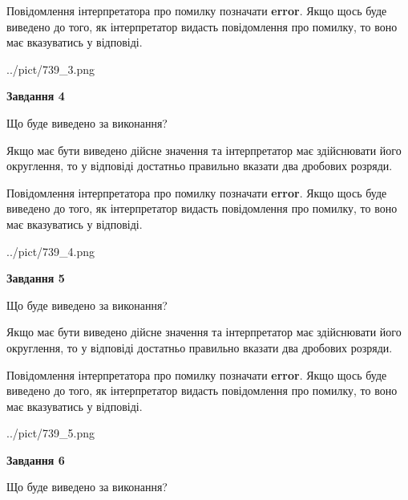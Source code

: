 \documentclass[12pt, ukrainian]{article}
\begin{document}
{\begin {Large}
Повідомлення інтерпретатора про помилку позначати \textbf{error}.
Якщо щось буде виведено до того, як інтерпретатор видасть повідомлення про помилку, 
то воно має вказуватись у відповіді. \par

\begin{center}
	{../pict/739_3.png}
\end{center}
\newpage

{\begin {center}\textbf{Завдання 4}\end {center}}\par
Що буде виведено за виконання? \par

Якщо має бути виведено дійсне значення та інтерпретатор має здійснювати його округлення, 
то у відповіді достатньо правильно вказати два дробових розряди.

Повідомлення інтерпретатора про помилку позначати \textbf{error}.
Якщо щось буде виведено до того, як інтерпретатор видасть повідомлення про помилку, 
то воно має вказуватись у відповіді. \par

\begin{center}
	{../pict/739_4.png}
\end{center}
\newpage

{\begin {center}\textbf{Завдання 5}\end {center}}\par
Що буде виведено за виконання? \par

Якщо має бути виведено дійсне значення та інтерпретатор має здійснювати його округлення, 
то у відповіді достатньо правильно вказати два дробових розряди.

Повідомлення інтерпретатора про помилку позначати \textbf{error}.
Якщо щось буде виведено до того, як інтерпретатор видасть повідомлення про помилку, 
то воно має вказуватись у відповіді. \par

\begin{center}
	{../pict/739_5.png}
\end{center}
\newpage

{\begin {center}\textbf{Завдання 6}\end {center}}\par
Що буде виведено за виконання? \par


\end{Large}}
\end{document}
